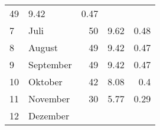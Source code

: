 \begin{longtable}{lXrrr}
       \num{49} &
       \num[round-mode=places,round-precision=2]{9.42} &
         \num[round-mode=places,round-precision=2]{0.47} \\

     7 &
     \multicolumn{1}{X}{ Juli   } &


       \num{50} &
       \num[round-mode=places,round-precision=2]{9.62} &
         \num[round-mode=places,round-precision=2]{0.48} \\

     8 &
     \multicolumn{1}{X}{ August   } &


       \num{49} &
       \num[round-mode=places,round-precision=2]{9.42} &
         \num[round-mode=places,round-precision=2]{0.47} \\

     9 &
     \multicolumn{1}{X}{ September   } &


       \num{49} &
       \num[round-mode=places,round-precision=2]{9.42} &
         \num[round-mode=places,round-precision=2]{0.47} \\

     10 &
     \multicolumn{1}{X}{ Oktober   } &


       \num{42} &
       \num[round-mode=places,round-precision=2]{8.08} &
         \num[round-mode=places,round-precision=2]{0.4} \\

     11 &
     \multicolumn{1}{X}{ November   } &


       \num{30} &
       \num[round-mode=places,round-precision=2]{5.77} &
         \num[round-mode=places,round-precision=2]{0.29} \\

     12 &
     \multicolumn{1}{X}{ Dezember   } &



\end{longtable}
